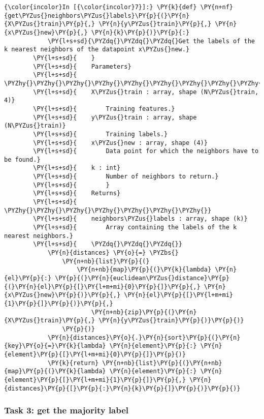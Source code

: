     \begin{Verbatim}[commandchars=\\\{\}]
{\color{incolor}In [{\color{incolor}7}]:} \PY{k}{def} \PY{n+nf}{get\PYZus{}neighbors\PYZus{}labels}\PY{p}{(}\PY{n}{X\PYZus{}train}\PY{p}{,} \PY{n}{y\PYZus{}train}\PY{p}{,} \PY{n}{x\PYZus{}new}\PY{p}{,} \PY{n}{k}\PY{p}{)}\PY{p}{:}
            \PY{l+s+sd}{\PYZdq{}\PYZdq{}\PYZdq{}Get the labels of the k nearest neighbors of the datapoint x\PYZus{}new.}
        \PY{l+s+sd}{    }
        \PY{l+s+sd}{    Parameters}
        \PY{l+s+sd}{    \PYZhy{}\PYZhy{}\PYZhy{}\PYZhy{}\PYZhy{}\PYZhy{}\PYZhy{}\PYZhy{}\PYZhy{}\PYZhy{}}
        \PY{l+s+sd}{    X\PYZus{}train : array, shape (N\PYZus{}train, 4)}
        \PY{l+s+sd}{        Training features.}
        \PY{l+s+sd}{    y\PYZus{}train : array, shape (N\PYZus{}train)}
        \PY{l+s+sd}{        Training labels.}
        \PY{l+s+sd}{    x\PYZus{}new : array, shape (4)}
        \PY{l+s+sd}{        Data point for which the neighbors have to be found.}
        \PY{l+s+sd}{    k : int}
        \PY{l+s+sd}{        Number of neighbors to return.}
        \PY{l+s+sd}{        }
        \PY{l+s+sd}{    Returns}
        \PY{l+s+sd}{    \PYZhy{}\PYZhy{}\PYZhy{}\PYZhy{}\PYZhy{}\PYZhy{}\PYZhy{}}
        \PY{l+s+sd}{    neighbors\PYZus{}labels : array, shape (k)}
        \PY{l+s+sd}{        Array containing the labels of the k nearest neighbors.}
        \PY{l+s+sd}{    \PYZdq{}\PYZdq{}\PYZdq{}}
            \PY{n}{distances} \PY{o}{=} \PYZbs{}
                \PY{n+nb}{list}\PY{p}{(}
                    \PY{n+nb}{map}\PY{p}{(}\PY{k}{lambda} \PY{n}{el}\PY{p}{:} \PY{p}{(}\PY{n}{euclidean\PYZus{}distance}\PY{p}{(}\PY{n}{el}\PY{p}{[}\PY{l+m+mi}{0}\PY{p}{]}\PY{p}{,} \PY{n}{x\PYZus{}new}\PY{p}{)}\PY{p}{,} \PY{n}{el}\PY{p}{[}\PY{l+m+mi}{1}\PY{p}{]}\PY{p}{)}\PY{p}{,} 
                        \PY{n+nb}{zip}\PY{p}{(}\PY{n}{X\PYZus{}train}\PY{p}{,} \PY{n}{y\PYZus{}train}\PY{p}{)}\PY{p}{)}
                \PY{p}{)}
            \PY{n}{distances}\PY{o}{.}\PY{n}{sort}\PY{p}{(}\PY{n}{key}\PY{o}{=}\PY{k}{lambda} \PY{n}{element}\PY{p}{:} \PY{n}{element}\PY{p}{[}\PY{l+m+mi}{0}\PY{p}{]}\PY{p}{)}
            \PY{k}{return} \PY{n+nb}{list}\PY{p}{(}\PY{n+nb}{map}\PY{p}{(}\PY{k}{lambda} \PY{n}{element}\PY{p}{:} \PY{n}{element}\PY{p}{[}\PY{l+m+mi}{1}\PY{p}{]}\PY{p}{,} \PY{n}{distances}\PY{p}{[}\PY{p}{:}\PY{n}{k}\PY{p}{]}\PY{p}{)}\PY{p}{)}
\end{Verbatim}

    \hypertarget{task-3-get-the-majority-label}{%
\subsubsection{Task 3: get the majority
label}\label{task-3-get-the-majority-label}}

